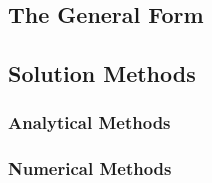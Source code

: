 \subsection{The General Form}



\subsection{Solution Methods}


\subsubsection{Analytical Methods}

\subsubsection{Numerical Methods}




\begin{comment}


https://en.wikipedia.org/wiki/Fokker%
https://en.wikipedia.org/wiki/Convection%
https://en.wikipedia.org/wiki/Klein%
https://en.wikipedia.org/wiki/Master_equation




\end{comment}